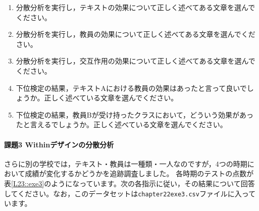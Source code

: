 \documentclass{ltjbook}
\begin{document}
\begin{enumerate}
	\item 分散分析を実行し，テキストの効果について正しく述べてある文章を選んでください。
	\item 分散分析を実行し，教員の効果について正しく述べてある文章を選んでください。
	\item 分散分析を実行し，交互作用の効果について正しく述べてある文章を選んでください。
	\item 下位検定の結果，テキストAにおける教員の効果はあったと言って良いでしょうか。正しく述べている文章を選んでください。
	\item 下位検定の結果，教員Bが受け持ったクラスにおいて，どういう効果があったと言えるでしょうか。正しく述べている文章を選んでください。
\end{enumerate}

\paragraph{課題3 Withinデザインの分散分析}
さらに別の学校では，テキスト・教員は一種類・一人なのですが，4つの時期において成績が変化するかどうかを追跡調査しました。
各時期のテストの点数が表\ref{L23::exe3}のようになっています。次の各指示に従い，その結果について回答してください。なお，このデータセットは\texttt{chapter22exe3.csv}ファイルに入っています。
\end{document}
